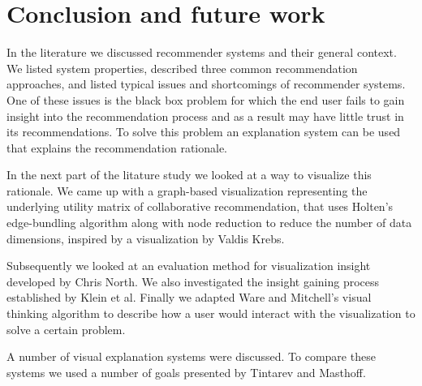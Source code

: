 \chapter{Conclusion and future work}\label{chapter:conclusion}



In the literature we discussed recommender systems and their general context. We listed system properties, described three common recommendation approaches, and listed typical issues and shortcomings of recommender systems. One of these issues is the black box problem for which the end user fails to gain insight into the recommendation process and as a result may have little trust in its recommendations. To solve this problem an explanation system can be used that explains the recommendation rationale.

In the next part of the litature study we looked at a way to visualize this rationale. We came up with a graph-based visualization representing the underlying utility matrix of collaborative recommendation, that uses Holten's edge-bundling algorithm along with node reduction to reduce the number of data dimensions, inspired by a visualization by Valdis Krebs.

Subsequently we looked at an evaluation method for visualization insight developed by Chris North. We also investigated the insight gaining process established by Klein et al. Finally we adapted Ware and Mitchell's visual thinking algorithm to describe how a user would interact with the visualization to solve a certain problem.

A number of visual explanation systems were discussed. To compare these systems we used a number of goals presented by Tintarev and Masthoff.




